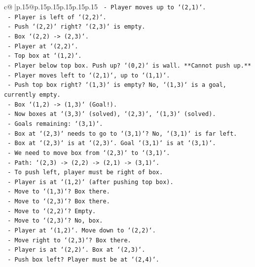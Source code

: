 \documentclass{article}
\begin{document}
{\begin{supertabular}{c@{$\;$}|p{.15\linewidth}@{}p{.15\linewidth}p{.15\linewidth}p{.15\linewidth}p{.15\linewidth}p{.15\linewidth}}
{{{\texttt{       {-} Player moves up to `(2,1)`.} \\
\texttt{       {-} Player is left of `(2,2)`.} \\
\texttt{       {-} Push `(2,2)` right? `(2,3)` is empty.} \\
\texttt{       {-} Box `(2,2) {-}> (2,3)`.} \\
\texttt{       {-} Player at `(2,2)`.} \\
\texttt{       {-} Top box at `(1,2)`.} \\
\texttt{       {-} Player below top box. Push up? `(0,2)` is wall. **Cannot push up.**} \\
\texttt{       {-} Player moves left to `(2,1)`, up to `(1,1)`.} \\
\texttt{       {-} Push top box right? `(1,3)` is empty? No, `(1,3)` is a goal, currently empty.} \\
\texttt{       {-} Box `(1,2) {-}> (1,3)` (Goal!).} \\
\texttt{       {-} Now boxes at `(3,3)` (solved), `(2,3)`, `(1,3)` (solved).} \\
\texttt{       {-} Goals remaining: `(3,1)`.} \\
\texttt{       {-} Box at `(2,3)` needs to go to `(3,1)`? No, `(3,1)` is far left.} \\
\texttt{       {-} Box at `(2,3)` is at `(2,3)`. Goal `(3,1)` is at `(3,1)`.} \\
\texttt{       {-} We need to move box from `(2,3)` to `(3,1)`.} \\
\texttt{       {-} Path: `(2,3) {-}> (2,2) {-}> (2,1) {-}> (3,1)`.} \\
\texttt{       {-} To push left, player must be right of box.} \\
\texttt{       {-} Player is at `(1,2)` (after pushing top box).} \\
\texttt{       {-} Move to `(1,3)`? Box there.} \\
\texttt{       {-} Move to `(2,3)`? Box there.} \\
\texttt{       {-} Move to `(2,2)`? Empty.} \\
\texttt{       {-} Move to `(2,3)`? No, box.} \\
\texttt{       {-} Player at `(1,2)`. Move down to `(2,2)`.} \\
\texttt{       {-} Move right to `(2,3)`? Box there.} \\
\texttt{       {-} Player is at `(2,2)`. Box at `(2,3)`.} \\
\texttt{       {-} Push box left? Player must be at `(2,4)`.} \\
}}}
\end{supertabular}}
\end{document}
